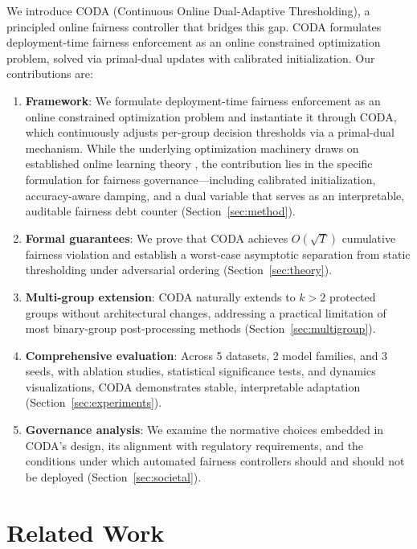 \documentclass[letterpaper]{article} %
\theoremstyle{definition}
\begin{document}
We introduce CODA (Continuous Online Dual-Adaptive Thresholding), a principled online fairness controller that bridges this gap. CODA formulates deployment-time fairness enforcement as an online constrained optimization problem, solved via primal-dual updates with calibrated initialization. Our contributions are:

\begin{enumerate}
    \item \textbf{Framework}: We formulate deployment-time fairness enforcement as an online constrained optimization problem and instantiate it through CODA, which continuously adjusts per-group decision thresholds via a primal-dual mechanism. While the underlying optimization machinery draws on established online learning theory \cite{mahdavi2012trading}, the contribution lies in the specific formulation for fairness governance---including calibrated initialization, accuracy-aware damping, and a dual variable that serves as an interpretable, auditable fairness debt counter (Section~\ref{sec:method}).
    \item \textbf{Formal guarantees}: We prove that CODA achieves $O(\sqrt{T})$ cumulative fairness violation and establish a worst-case asymptotic separation from static thresholding under adversarial ordering (Section~\ref{sec:theory}).
    \item \textbf{Multi-group extension}: CODA naturally extends to $k > 2$ protected groups without architectural changes, addressing a practical limitation of most binary-group post-processing methods (Section~\ref{sec:multigroup}).
    \item \textbf{Comprehensive evaluation}: Across 5 datasets, 2 model families, and 3 seeds, with ablation studies, statistical significance tests, and dynamics visualizations, CODA demonstrates stable, interpretable adaptation (Section~\ref{sec:experiments}).
    \item \textbf{Governance analysis}: We examine the normative choices embedded in CODA's design, its alignment with regulatory requirements, and the conditions under which automated fairness controllers should and should not be deployed (Section~\ref{sec:societal}).
\end{enumerate}

\section{Related Work}
\label{sec:related}
\end{document}

